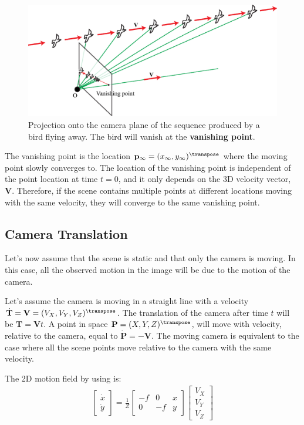 \begin{figure}[h!]
\centerline{
\includegraphics[width=1\linewidth]{figures/optical_flow/flying_bird.eps}
} 
\caption{Projection onto the camera plane of the sequence produced by a bird flying away. The bird will vanish at the {\bf vanishing point}.}
\label{fig:flying_bird}
\end{figure}

The vanishing point is the location $\mathbf{p}_{\infty}=(x_{\infty}, y_{\infty})^\transpose$ where the moving point slowly converges to. The location of the vanishing point is independent of the point location at time $t=0$, and it only depends on the 3D velocity vector, $\mathbf{V}$. Therefore, if the scene contains multiple points at different locations moving with the same velocity, they will converge to the same vanishing point.

\subsection{Camera Translation}

Let's now assume that the scene is static and that only the camera is moving. In this case, all the observed motion in the image will be due to the motion of the camera. 

Let's assume the camera is moving in a straight line with a velocity $\dot{\mathbf{T}} = \mathbf{V} = (V_X,V_Y,V_Z)^\transpose$. The translation of the camera after time $t$ will be $\mathbf{T} = \mathbf{V} t$. A point in space $\mathbf{P} = (X,Y,Z)^\transpose$, will move with velocity, relative to the camera, equal to $\dot{\mathbf{P}} = -\mathbf{V}$.  The moving camera is equivalent to the case where all the scene points move relative to the camera with the same velocity. 

The 2D motion field by using \eqn{\ref{eq:motionprojection}} is:
\begin{align}
\begin{bmatrix}
\dot{x} \\
\dot{y}
\end{bmatrix}
= \frac{1}{Z}
\begin{bmatrix}
-f & 0 & x \\
0 & -f & y  
\end{bmatrix}
\begin{bmatrix}
V_X\\
V_Y \\
V_Z 
\end{bmatrix}
\label{eq:2d_motion_field_equation}
\end{align}


